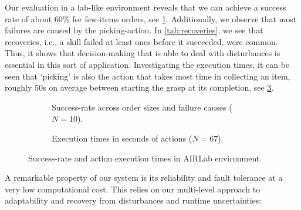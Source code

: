 
Our evaluation in a lab-like environment reveals that we can
achieve a success rate of about 60\% for few-items orders,
see \cref{fig:success_lab}. Additionally, we observe that
most failures are caused by the picking-action.
In \cref{tab:recoveries}, we see that recoveries, i.e., a skill failed at least ones before it succeeded, were common. Thus, it shows that decision-making that is able to deal with disturbances is essential in this sort of application.
Investigating the 
execution times, it can be seen that `picking' is also the action
that takes most time in collecting an item, roughly $50$s on average between starting the grasp at its completion, 
see \cref{fig:timings_lab}.
\begin{figure}
\begin{subfigure}[b]{1\linewidth}
    \centering
    
    \caption{Success-rate across order sizes and failure causes ($N=10$).}
    \label{fig:success_lab}
  \end{subfigure}
\begin{subfigure}[b]{1\linewidth}
    \centering%
     
    \caption{Execution times in seconds of actions ($N=67$).}
    \label{fig:timings_lab}
  \end{subfigure}
  \caption{Success-rate and action execution times in AIRLab environment.}
\end{figure}

A remarkable property of our system is its reliability and fault tolerance at a very low computational cost. This relies on our multi-level approach to adaptability and recovery from disturbances and runtime uncertainties:
